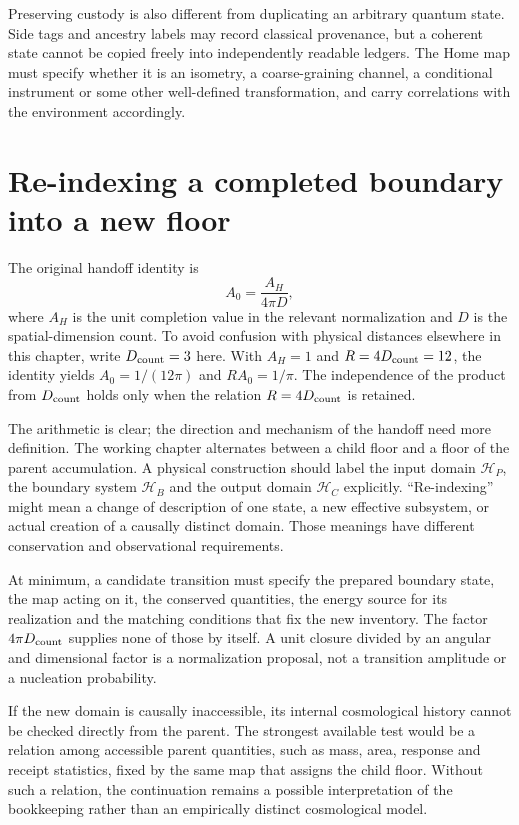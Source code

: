 Preserving custody is also different from duplicating an arbitrary quantum state. Side tags and ancestry labels may record classical provenance, but a coherent state cannot be copied freely into independently readable ledgers. The Home map must specify whether it is an isometry, a coarse-graining channel, a conditional instrument or some other well-defined transformation, and carry correlations with the environment accordingly.

\section{Re-indexing a completed boundary into a new floor}
The original handoff identity is
\begin{equation}
 A_0=\frac{A_H}{4\pi D},
 \label{c12:handoff}
\end{equation}
where $A_H$ is the unit completion value in the relevant normalization and $D$ is the spatial-dimension count. To avoid confusion with physical distances elsewhere in this chapter, write $D_{\rm count}=3$ here. With $A_H=1$ and $R=4D_{\rm count}=12$, the identity yields $A_0=1/(12\pi)$ and $RA_0=1/\pi$. The independence of the product from $D_{\rm count}$ holds only when the relation $R=4D_{\rm count}$ is retained.

The arithmetic is clear; the direction and mechanism of the handoff need more definition. The working chapter alternates between a child floor and a floor of the parent accumulation. A physical construction should label the input domain $\mathcal H_P$, the boundary system $\mathcal H_B$ and the output domain $\mathcal H_C$ explicitly. ``Re-indexing'' might mean a change of description of one state, a new effective subsystem, or actual creation of a causally distinct domain. Those meanings have different conservation and observational requirements.

At minimum, a candidate transition must specify the prepared boundary state, the map acting on it, the conserved quantities, the energy source for its realization and the matching conditions that fix the new inventory. The factor $4\pi D_{\rm count}$ supplies none of those by itself. A unit closure divided by an angular and dimensional factor is a normalization proposal, not a transition amplitude or a nucleation probability.

If the new domain is causally inaccessible, its internal cosmological history cannot be checked directly from the parent. The strongest available test would be a relation among accessible parent quantities, such as mass, area, response and receipt statistics, fixed by the same map that assigns the child floor. Without such a relation, the continuation remains a possible interpretation of the bookkeeping rather than an empirically distinct cosmological model.

